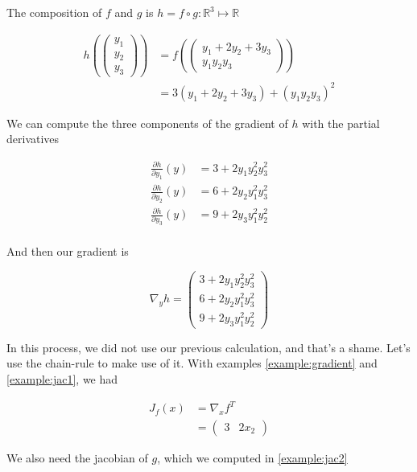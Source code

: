 \documentclass{tufte-handout}
\begin{document}
The composition of $ f $ and $ g $ is $ h = f \circ g : \mathbb{R}^3 \mapsto \mathbb{R} $

\begin{align*}
 h(\begin{pmatrix}
 y_1\\y_2\\y_3
 \end{pmatrix}) &= f(\begin{pmatrix}
 y_1 + 2y_2 + 3y_3 \\ y_1y_2y_3
 \end{pmatrix})\\
 &= 3(y_1 + 2y_2 + 3y_3) + (y_1y_2y_3)^2
\end{align*}

We can compute the three components of the gradient of $ h $ with the partial derivatives

\begin{align*}
\frac{\partial h}{\partial y_1}(y) &= 3 + 2y_1y_2^2y_3^2\\
\frac{\partial h}{\partial y_2}(y) &= 6 + 2y_2y_1^2y_3^2\\
\frac{\partial h}{\partial y_3}(y) &= 9 + 2y_3y_1^2y_2^2\\
\end{align*}

And then our gradient is

$$ \nabla_y h = \begin{pmatrix}
3 + 2y_1y_2^2y_3^2 \\ 6 + 2y_2y_1^2y_3^2 \\ 9 + 2y_3y_1^2y_2^2
\end{pmatrix}  $$

In this process, we did not use our previous calculation, and that's a shame. Let's use the chain-rule to make use of it. With examples \ref{example:gradient} and \ref{example:jac1}, we had


\begin{align*}
 J_f(x) &= \nabla_x f^T\\
 &= \begin{pmatrix}
3  & 2 x_2
\end{pmatrix}
\end{align*}

We also need the jacobian of $ g $, which we computed in \ref{example:jac2}
\end{document}
